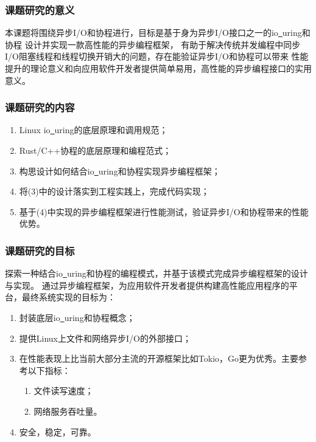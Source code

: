 \documentclass[supercite]{HustGraduPaper}
\theoremstyle{definition}
\begin{document}
\subsubsection{课题研究的意义}
本课题将围绕异步I/O和协程进行，目标是基于身为异步I/O接口之一的io\underline{~}uring和协程
设计并实现一款高性能的异步编程框架，
有助于解决传统并发编程中同步I/O阻塞线程和线程切换开销大的问题，存在能验证异步I/O和协程可以带来
性能提升的理论意义和向应用软件开发者提供简单易用，高性能的异步编程接口的实用意义。\par

\subsubsection{课题研究的内容}
\begin{enumerate}
  \item Linux io\underline{~}uring的底层原理和调用规范；
  \item Rust/C++协程的底层原理和编程范式；
  \item 构思设计如何结合io\underline{~}uring和协程实现异步编程框架；
  \item 将(3)中的设计落实到工程实践上，完成代码实现；
  \item 基于(4)中实现的异步编程框架进行性能测试，验证异步I/O和协程带来的性能优势。
\end{enumerate}

\subsubsection{课题研究的目标}
探索一种结合io\underline{~}uring和协程的编程模式，并基于该模式完成异步编程框架的设计与实现。
通过异步编程框架，为应用软件开发者提供构建高性能应用程序的平台，最终系统实现的目标为：

\begin{enumerate}
  \item 封装底层io\underline{~}uring和协程概念；
  \item 提供Linux上文件和网络异步I/O的外部接口；
  \item 在性能表现上比当前大部分主流的开源框架比如Tokio，Go更为优秀。主要参考以下指标：
    \begin{enumerate}
      \item 文件读写速度；
      \item 网络服务吞吐量。
    \end{enumerate}
  \item 安全，稳定，可靠。
\end{enumerate}
\end{document}
